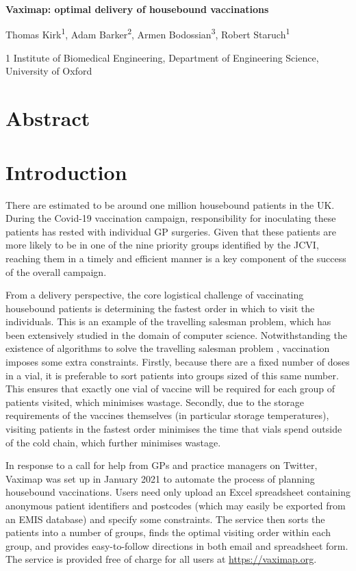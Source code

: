 \documentclass[11pt]{amsart}
\begin{document}
\begin{center}
\huge{\textbf{Vaximap: optimal delivery of housebound vaccinations}}

\large{Thomas Kirk\textsuperscript{1}, Adam Barker\textsuperscript{2}, Armen Bodossian\textsuperscript{3}, Robert Staruch\textsuperscript{1}}

\small{1 Institute of Biomedical Engineering, Department of Engineering Science, University of Oxford}

\end{center}

\section{Abstract}

\section{Introduction}

There are estimated to be around one million housebound patients in the UK. During the Covid-19 vaccination campaign, responsibility for inoculating these patients has rested with individual GP surgeries. Given that these patients are more likely to be in one of the nine priority groups identified by the JCVI, reaching them in a timely and efficient manner is a key component of the success of the overall campaign. 

From a delivery perspective, the core logistical challenge of vaccinating housebound patients is determining the fastest order in which to visit the individuals. This is an example of the travelling salesman problem, which has been extensively studied in the domain of computer science. Notwithstanding the existence of algorithms to solve the travelling salesman problem \cite{X}, vaccination imposes some extra constraints. Firstly, because there are a fixed number of doses in a vial, it is preferable to sort patients into groups sized of this same number. This ensures that exactly one vial of vaccine will be required for each group of patients visited, which minimises wastage. Secondly, due to the storage requirements of the vaccines themselves (in particular storage temperatures), visiting patients in the fastest order minimises the time that vials spend outside of the cold chain, which further minimises wastage. 

In response to a call for help from GPs and practice managers on Twitter, Vaximap was set up in January 2021 to automate the process of planning housebound vaccinations. Users need only upload an Excel spreadsheet containing anonymous patient identifiers and postcodes (which may easily be exported from an EMIS database) and specify some constraints. The service then sorts the patients into a number of groups, finds the optimal visiting order within each group, and provides easy-to-follow directions in both email and spreadsheet form. The service is provided free of charge for all users at \url{https://vaximap.org}. 
\end{document}
